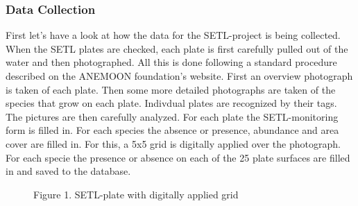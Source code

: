 \documentclass[letterpaper,10pt,english]{sphinxmanual}
\begin{document}
\subsubsection{Data Collection}
\label{user_manual:data-collection}
First let's have a look at how the data for the SETL-project is being
collected. When the SETL plates are checked, each plate is first
carefully pulled out of the water and then photographed. All this is
done following a standard procedure described on the ANEMOON
foundation's website. First an overview photograph is taken of each
plate. Then some more detailed photographs are taken of the species
that grow on each plate. Indivdual plates are recognized by their tags.
The pictures are then carefully analyzed. For each plate the
SETL-monitoring form is filled in. For each species the absence or
presence, abundance and area cover are filled in. For this, a 5x5 grid
is digitally applied over the photograph. For each specie the presence
or absence on each of the 25 plate surfaces are filled in and saved
to the database.
\begin{figure}[htbp]
\centering
\capstart

\caption{Figure 1. SETL-plate with digitally applied grid}\label{user_manual:fig-plate-with-grid}\end{figure}
\end{document}
